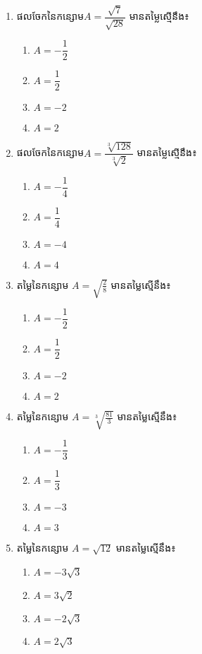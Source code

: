 \begin{enumerate}
\item ផលចែកនៃកន្សោម$A=\dfrac{\sqrt{7}}{\sqrt{28}}$  មានតម្លៃស្មើនឹង៖
\begin{multicols}{4}
\begin{enumerate}[label=\alph*.]
	\item $A=-\dfrac{1}{2}$
	\item $A=\dfrac{1}{2}$
	\item $A=-2$
	\item $A=2$
\end{enumerate}
\end{multicols}
\item ផលចែកនៃកន្សោម$A=\dfrac{\sqrt[3]{128}}{\sqrt[3]{2}}$  មានតម្លៃស្មើនឹង៖
\begin{multicols}{4}
\begin{enumerate}[label=\alph*.]
	\item $A=-\dfrac{1}{4}$
	\item $A=\dfrac{1}{4}$
	\item $A=-4$
	\item $A=4$
\end{enumerate}
\end{multicols}

\item តម្លៃនៃកន្សោម $A=\sqrt{\frac{2}{8}}$ មានតម្លៃស្មើនឹង៖
\begin{multicols}{4}
\begin{enumerate}[label=\alph*.]
	\item $A=-\dfrac{1}{2}$
	\item $A=\dfrac{1}{2}$
	\item $A=-2$
	\item $A=2$
\end{enumerate}
\end{multicols}

\item តម្លៃនៃកន្សោម $A=\sqrt[3]{\frac{81}{3}}$ មានតម្លៃស្មើនឹង៖
\begin{multicols}{4}
\begin{enumerate}[label=\alph*.]
	\item $A=-\dfrac{1}{3}$
	\item $A=\dfrac{1}{3}$
	\item $A=-3$
	\item $A=3$
\end{enumerate}
\end{multicols}

\item តម្លៃនៃកន្សោម $A=\sqrt{12}$ មានតម្លៃស្មើនឹង៖
\begin{multicols}{4}
\begin{enumerate}[label=\alph*.]
	\item $A=-3\sqrt{3}$
	\item $A=3\sqrt{2}$
	\item $A=-2\sqrt{3}$
	\item $A=2\sqrt{3}$
\end{enumerate}
\end{multicols}


\end{enumerate}
